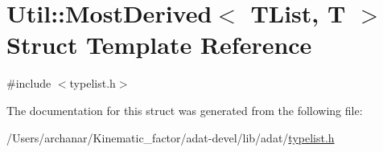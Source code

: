 \hypertarget{structUtil_1_1TL_1_1MostDerived}{}\section{Util\+:\+:Most\+Derived$<$ T\+List, T $>$ Struct Template Reference}
\label{structUtil_1_1TL_1_1MostDerived}


{\ttfamily \#include $<$typelist.\+h$>$}



The documentation for this struct was generated from the following file\+:\begin{DoxyCompactItemize}
\item 
/\+Users/archanar/\+Kinematic\+\_\+factor/adat-\/devel/lib/adat/\mbox{\hyperlink{adat-devel_2lib_2adat_2typelist_8h}{typelist.\+h}}\end{DoxyCompactItemize}
